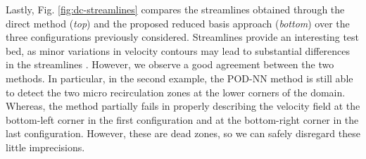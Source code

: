 \documentclass[12pt, a4paper, twoside, openright, notitlepage]{report}
\numberwithin{equation}{chapter}
\theoremstyle{theorem}
\theoremstyle{definition}
\theoremstyle{remark}
\theoremstyle{proposition}
\numberwithin{figure}{chapter}
\begin{document}
		\clearpage
								
		Lastly, Fig. \ref{fig:dc-streamlines} compares the streamlines obtained through the direct method (\emph{top}) and the proposed reduced basis approach (\emph{bottom}) over the three configurations previously considered. Streamlines provide an interesting test bed, as minor variations in velocity contours may lead to substantial differences in the streamlines \cite{Chen17}. However, we observe a good agreement between the two methods. In particular, in the second example, the POD-NN method is still able to detect the two micro recirculation zones at the lower corners of the domain. Whereas, the method partially fails in properly describing the velocity field at the bottom-left corner in the first configuration and at the bottom-right corner in the last configuration. However, these are dead zones, so we can safely disregard these little imprecisions.
				
\end{document}
